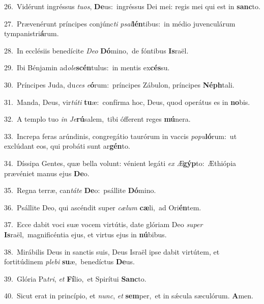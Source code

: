 {\numbfont\textcolor{\numbcolor}{26.}}~Vidérunt ingréssus \textit{tu}\-\textit{os}, \textbf{De}\-us:~\star ingréssus Dei mei: regis mei qui est in \textbf{sanc}\-to.\par
{\numbfont\textcolor{\numbcolor}{27.}}~Prævenérunt príncipes conjúnc\textit{ti} \textit{psal}\-\textbf{lén}tibus:~\star in médio juvenculárum tympanistri\-\textbf{á}\-rum.\par
{\numbfont\textcolor{\numbcolor}{28.}}~In ecclésiis benedícite \textit{De}\-\textit{o} \textbf{Dó}\-mino,~\star de fóntibus \textbf{Is}\-raël.\par
{\numbfont\textcolor{\numbcolor}{29.}}~Ibi Bénjamin ad\-\textit{o}\-\textit{le}\textbf{scén}tulus:~\star in mentis ex\-\textbf{cés}\-su.\par
{\numbfont\textcolor{\numbcolor}{30.}}~Príncipes Juda, du\textit{ces} \textit{e}\-\textbf{ó}rum:~\star príncipes Zábulon, príncipes \textbf{Néph}\-tali.\par
{\numbfont\textcolor{\numbcolor}{31.}}~Manda, Deus, vir\-\textit{tú}\-\textit{ti} \textbf{tu}\-æ:~\star confírma hoc, Deus, quod operátus es in \textbf{no}\-bis.\par
{\numbfont\textcolor{\numbcolor}{32.}}~A templo tuo \textit{in} \textit{Je}\-\textbf{rú}salem,~\star tibi ófferent reges \textbf{mú}\-nera.\par
{\numbfont\textcolor{\numbcolor}{33.}}~Increpa feras arúndinis, congregátio taurórum in vaccis \textit{po}\-\textit{pu}\textbf{ló}rum:~\star ut exclúdant eos, qui probáti sunt ar\-\textbf{gén}\-to.\par
{\numbfont\textcolor{\numbcolor}{34.}}~Díssipa Gentes, quæ bella volunt: vénient legáti \textit{ex} \textit{Æ}\-\textbf{gýp}to:~\star Æthiópia prævéniet manus ejus \textbf{De}\-o.\par
{\numbfont\textcolor{\numbcolor}{35.}}~Regna terræ, can\-\textit{tá}\-\textit{te} \textbf{De}\-o:~\star psállite \textbf{Dó}\-mino.\par
{\numbfont\textcolor{\numbcolor}{36.}}~Psállite Deo, qui ascéndit super \textit{cæ}\-\textit{lum} \textbf{cæ}\-li,~\star ad Ori\-\textbf{én}\-tem.\par
{\numbfont\textcolor{\numbcolor}{37.}}~Ecce dabit voci suæ vocem virtútis, date glóriam Deo \textit{su}\-\textit{per} \textbf{Is}\-raël,~\star magnificéntia ejus, et virtus ejus in \textbf{nú}\-bibus.\par
{\numbfont\textcolor{\numbcolor}{38.}}~Mirábilis Deus in sanctis suis, Deus Israël ipse dabit virtútem, et fortitúdinem \textit{ple}\-\textit{bi} \textbf{su}\-æ,~\star benedíctus \textbf{De}\-us.\par
{\numbfont\textcolor{\numbcolor}{39.}}~Glória Pa\-\textit{tri}\-, \textit{et} \textbf{Fí}\-lio,~\star et Spirítui \textbf{Sanc}\-to.\par
{\numbfont\textcolor{\numbcolor}{40.}}~Sicut erat in princípio, et \textit{nunc}\-, \textit{et} \textbf{sem}\-per,~\star et in sǽcula sæculórum. \textbf{A}\-men.\par
